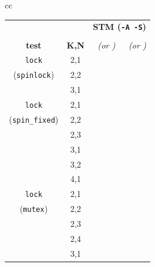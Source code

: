\begin{table}[hb!] %
	\begin{center}
		\begin{tabular}{cc}
		\footnotesize
		\begin{tabular}{cc||r|r}
			& & \multicolumn{2}{c}{\bf STM ({\tt -A -S})} \\
			& & \cpu{\bf cpu (s)} & \ints{\bf SS size} \\
			\bf test & \bf K,N  & \em (or \ETAdag{\bf \em est.})
			                      & \em (or \ETAdag{\bf \em est.}) \\
			\hline
			\hline
			{\tt lock}
			& 2,1 & \cpu{3.41} & \ints{4} \\
			({\tt spinlock})
			& 2,2 & \cpu{198.77} & \ints{1702} \\
			& 3,1 & \cpu{35.28} & \ints{246} \\
			\hline
			{\tt lock}
			& 2,1 & \cpu{3.55} & \ints{4} \\
			({\tt spin\_fixed})
			& 2,2 & \cpu{105.57} & \ints{998} \\
			& 2,3 & \ETAdag{33h 13m} & \ETAdag{321553} \\
			& 3,1 & \cpu{28.27} & \ints{186} \\
			& 3,2 & \ETAdag{13y 281d} & \ETAdag{1443676} \\
			& 4,1 & \ETAdag{16h 26m} & \ETAdag{432628} \\ %
			\hline
			{\tt lock}
			& 2,1 & \cpu{3.44} & \ints{4}		\\
			({\tt mutex})
			& 2,2 & \cpu{16.83} & \ints{180}	\\
			& 2,3 & \cpu{405.21} & \ints{9372}	\\
			& 2,4 & \cpu{24999.68} & \ints{489480}	\\ %
			& 3,1 & \cpu{15.00} & \ints{132}	\\

\end{tabular}
\end{tabular}
\end{center}
\end{table}
